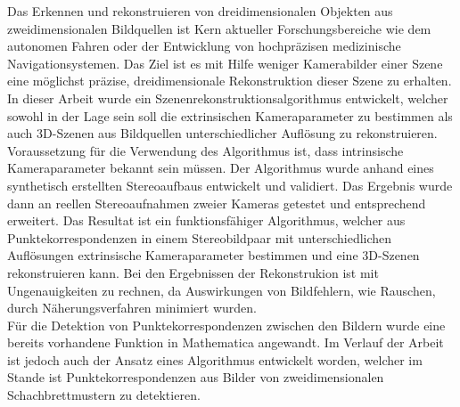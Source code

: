 
Das Erkennen und rekonstruieren von dreidimensionalen Objekten aus zweidimensionalen Bildquellen ist Kern aktueller Forschungsbereiche wie dem autonomen Fahren oder der Entwicklung von hochpräzisen medizinische Navigationsystemen. Das Ziel ist es mit Hilfe weniger Kamerabilder einer Szene eine möglichst präzise, dreidimensionale Rekonstruktion dieser Szene zu erhalten.\\


In dieser Arbeit wurde ein Szenenrekonstruktionsalgorithmus entwickelt, welcher sowohl in der Lage sein soll die extrinsischen Kameraparameter zu bestimmen als auch 3D-Szenen aus Bildquellen unterschiedlicher Auflösung zu rekonstruieren. Voraussetzung für die Verwendung des Algorithmus ist, dass intrinsische Kameraparameter bekannt sein müssen. Der Algorithmus wurde anhand eines synthetisch erstellten Stereoaufbaus entwickelt und validiert. Das Ergebnis wurde dann an reellen Stereoaufnahmen zweier Kameras getestet und entsprechend erweitert. Das Resultat ist ein funktionsfähiger Algorithmus, welcher aus Punktekorrespondenzen in einem Stereobildpaar mit unterschiedlichen Auflösungen extrinsische Kameraparameter bestimmen und eine 3D-Szenen rekonstruieren kann. Bei den Ergebnissen der Rekonstrukion ist mit Ungenauigkeiten zu rechnen, da Auswirkungen von Bildfehlern, wie Rauschen, durch Näherungsverfahren minimiert wurden.\\

Für die Detektion von Punktekorrespondenzen zwischen den Bildern wurde eine bereits vorhandene Funktion in Mathematica angewandt. Im Verlauf der Arbeit ist jedoch auch der Ansatz eines Algorithmus entwickelt worden, welcher im Stande ist Punktekorrespondenzen aus Bilder von zweidimensionalen Schachbrettmustern zu detektieren. \\ 

%

